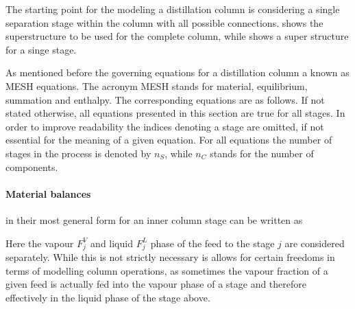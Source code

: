         The starting point for the modeling a distillation column is considering a single separation stage within the
        column with all possible connections.  shows the superstructure to be used for the complete
        column, while  shows a super structure for a singe stage.

        As mentioned before the governing equations for a distillation column a known as MESH equations. The acronym
        MESH stands for material, equilibrium, summation and enthalpy. The corresponding equations are as follows.
        If not stated otherwise, all equations presented in this section are true for all stages. In order
        to improve readability the indices denoting a stage are omitted, if not essential for the meaning of
        a given equation. For all equations the number of stages in the process is denoted by $n_S$, while $n_C$
        stands for the number of components.


        \paragraph{Material balances} in their most general form for an inner column stage can be written as

        Here the vapour $F^V_j$ and liquid $F^L_j$ phase of the feed to the stage $j$ are considered separately.
        While this is not strictly necessary is allows for certain freedoms in terms of modelling
        column operations, as sometimes the vapour fraction of a given feed is actually fed into
        the vapour phase of a stage and therefore effectively in the liquid phase of the stage above.

